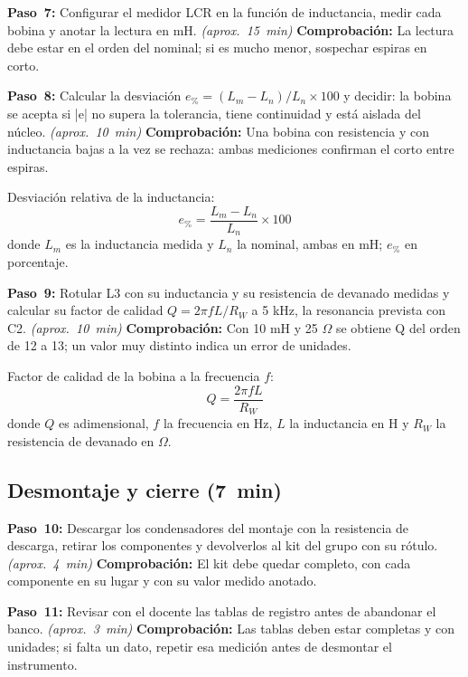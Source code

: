 \documentclass[12pt]{article}
\begin{document}
\begin{pasos}
  \item \textbf{Paso~7:} Configurar el medidor LCR en la función de inductancia, medir cada bobina y anotar la lectura en mH. \emph{(aprox.~\SI{15}{\minute})} \textbf{Comprobación:} La lectura debe estar en el orden del nominal; si es mucho menor, sospechar espiras en corto.
  \item \textbf{Paso~8:} Calcular la desviación $e_{\text{\%}} = (L_m - L_n)/L_n \times 100$ y decidir: la bobina se acepta si |e| no supera la tolerancia, tiene continuidad y está aislada del núcleo. \emph{(aprox.~\SI{10}{\minute})} \textbf{Comprobación:} Una bobina con resistencia y con inductancia bajas a la vez se rechaza: ambas mediciones confirman el corto entre espiras.
\par Desviación relativa de la inductancia:
\begin{equation}
  e_{\text{\%}} = \frac{L_m - L_n}{L_n} \times 100
  \label{eq:paso-8}
\end{equation}
donde $L_m$ es la inductancia medida y $L_n$ la nominal, ambas en mH; $e_{\text{\%}}$ en porcentaje.
  \item \textbf{Paso~9:} Rotular L3 con su inductancia y su resistencia de devanado medidas y calcular su factor de calidad $Q = 2\pi f L / R_W$ a 5 kHz, la resonancia prevista con C2. \emph{(aprox.~\SI{10}{\minute})} \textbf{Comprobación:} Con 10 mH y 25 \ensuremath{\Omega} se obtiene Q del orden de 12 a 13; un valor muy distinto indica un error de unidades.
\par Factor de calidad de la bobina a la frecuencia $f$:
\begin{equation}
  Q = \frac{2\pi f L}{R_W}
  \label{eq:paso-9}
\end{equation}
donde $Q$ es adimensional, $f$ la frecuencia en Hz, $L$ la inductancia en H y $R_W$ la resistencia de devanado en \ensuremath{\Omega}.
\end{pasos}
\subsection{Desmontaje y cierre (\SI{7}{\minute})}\label{sec:etapa-4}
\begin{pasos}
  \item \textbf{Paso~10:} Descargar los condensadores del montaje con la resistencia de descarga, retirar los componentes y devolverlos al kit del grupo con su rótulo. \emph{(aprox.~\SI{4}{\minute})} \textbf{Comprobación:} El kit debe quedar completo, con cada componente en su lugar y con su valor medido anotado.
  \item \textbf{Paso~11:} Revisar con el docente las tablas de registro antes de abandonar el banco. \emph{(aprox.~\SI{3}{\minute})} \textbf{Comprobación:} Las tablas deben estar completas y con unidades; si falta un dato, repetir esa medición antes de desmontar el instrumento.
\end{pasos}
\end{document}

